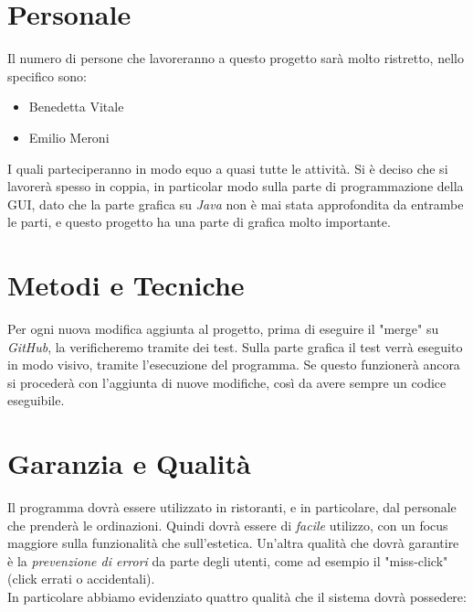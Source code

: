 \documentclass[12pt, letterpaper]{book}
\begin{document}
\section{Personale}
Il numero di persone che lavoreranno a questo progetto sarà molto ristretto, nello specifico sono:
\begin{itemize}
    \item Benedetta Vitale
    \item Emilio Meroni
\end{itemize}
I quali parteciperanno in modo equo a quasi tutte le attività. Si è deciso che si lavorerà spesso in coppia, in particolar modo sulla parte di programmazione della GUI, dato che la parte grafica su \textit{Java} non è mai stata approfondita da entrambe le parti, e questo progetto ha una parte di grafica molto importante.


\section{Metodi e Tecniche}

Per ogni nuova modifica aggiunta al progetto, prima di eseguire il "merge" su \textit{GitHub}, la verificheremo tramite dei test. Sulla parte grafica il test verrà eseguito in modo visivo, tramite l'esecuzione del programma.
Se questo funzionerà ancora si procederà con l'aggiunta di nuove modifiche, così da avere sempre un codice eseguibile.

\section{Garanzia e Qualità}

Il programma dovrà essere utilizzato in ristoranti, e in particolare, dal personale che prenderà le ordinazioni. Quindi dovrà essere di \textit{facile} utilizzo, con un focus maggiore sulla funzionalità che sull'estetica. Un'altra qualità che dovrà garantire è la \textit{prevenzione di errori} da parte degli utenti, come ad esempio il "miss-click" (click errati o accidentali).\\

In particolare abbiamo evidenziato quattro qualità che il sistema dovrà possedere:
\end{document}
